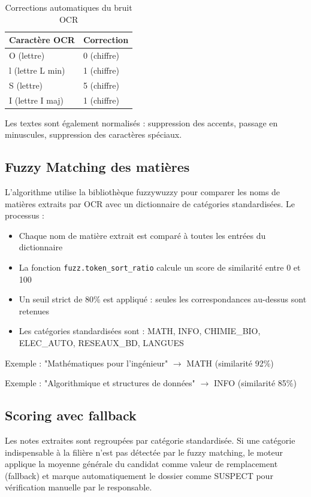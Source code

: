 \begin{table}[htbp]
\centering
\caption{Corrections automatiques du bruit OCR}
\label{tab:corrections-ocr}
\begin{tabular}{p{5cm} p{5cm}}
\toprule
\textbf{Caractère OCR} & \textbf{Correction} \\
\midrule
O (lettre) & 0 (chiffre) \\
l (lettre L min) & 1 (chiffre) \\
S (lettre) & 5 (chiffre) \\
I (lettre I maj) & 1 (chiffre) \\
\bottomrule
\end{tabular}
\end{table}

Les textes sont également normalisés : suppression des accents, passage en minuscules, suppression des caractères spéciaux.

\subsection{Fuzzy Matching des matières}
L'algorithme utilise la bibliothèque fuzzywuzzy pour comparer les noms de matières extraits par OCR avec un dictionnaire de catégories standardisées. Le processus :
\begin{itemize}
\item Chaque nom de matière extrait est comparé à toutes les entrées du dictionnaire
\item La fonction \texttt{fuzz.token\_sort\_ratio} calcule un score de similarité entre 0 et 100
\item Un seuil strict de 80\% est appliqué : seules les correspondances au-dessus sont retenues
\item Les catégories standardisées sont : MATH, INFO, CHIMIE\_BIO, ELEC\_AUTO, RESEAUX\_BD, LANGUES
\end{itemize}

Exemple : "Mathématiques pour l'ingénieur" $\rightarrow$ MATH (similarité 92\%)

Exemple : "Algorithmique et structures de données" $\rightarrow$ INFO (similarité 85\%)

\subsection{Scoring avec fallback}
Les notes extraites sont regroupées par catégorie standardisée. Si une catégorie indispensable à la filière n'est pas détectée par le fuzzy matching, le moteur applique la moyenne générale du candidat comme valeur de remplacement (fallback) et marque automatiquement le dossier comme SUSPECT pour vérification manuelle par le responsable.

